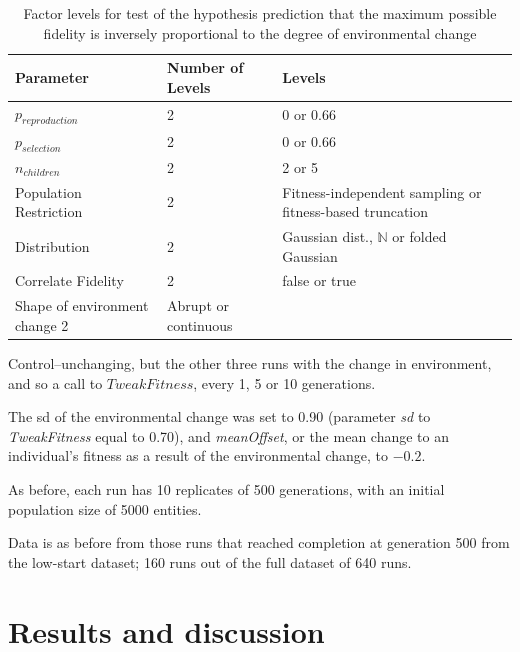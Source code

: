 \begin{table} %
	\begin{center}
		\caption{Factor levels for test of the hypothesis prediction that the maximum possible fidelity is inversely proportional to the degree of environmental change}
		\begin{tabular}{@{}llp{6cm}@{}}
			\toprule
			Parameter              & Number of Levels & Levels                                                   \\
			\midrule
			$p_{reproduction}$     & 2                & 0 or 0.66                                                \\
			$p_{selection}$        & 2                & 0 or 0.66                                                \\
			$n_{children}$         & 2                & 2 or 5                                                   \\
			Population Restriction & 2                & Fitness-independent sampling or fitness-based truncation \\
			Distribution           & 2                & Gaussian dist., $\mathbb{N}$ or folded Gaussian          \\
			Correlate Fidelity     & 2                & false or true                                            \\
			Shape of environment change		2&	Abrupt or continuous\\
			\bottomrule
		\end{tabular}
	\end{center}
\end{table}

Control--unchanging, but the other three runs with the change in environment, and so a call to $TweakFitness$, every 1, 5 or 10 generations.

The \gls{sd} of the environmental change was set to 0.90 (parameter \emph{sd} to \emph{TweakFitness} equal to 0.70), and \emph{meanOffset}, or the mean change to an individual's fitness as a result of the environmental change, to $-0.2$.

As before, each run has 10 replicates of 500 generations, with an initial population size of 5000 entities.

Data is as before from those runs that reached completion at generation 500 from the low-start dataset; 160 runs out of the full dataset of 640 runs.

\section{Results and discussion}\label{results-8}

